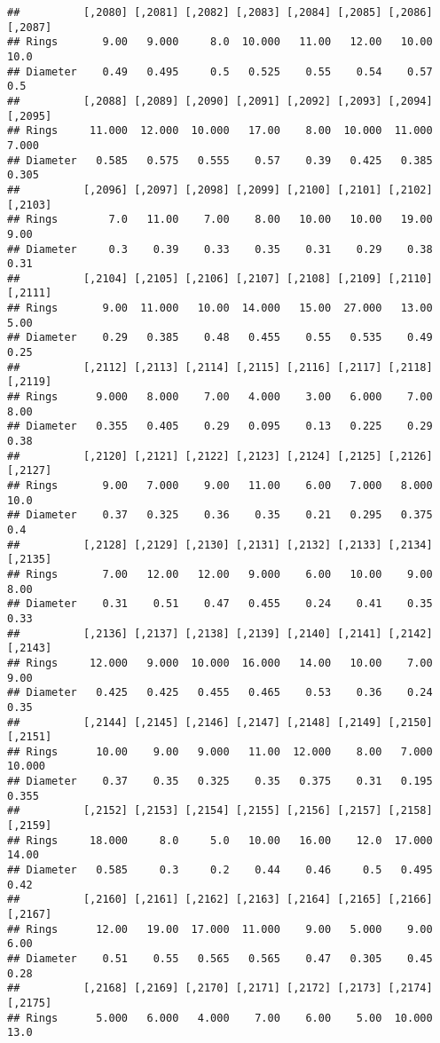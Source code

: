 \documentclass[
]{article}
\begin{document}
\begin{verbatim}
##          [,2080] [,2081] [,2082] [,2083] [,2084] [,2085] [,2086] [,2087]
## Rings       9.00   9.000     8.0  10.000   11.00   12.00   10.00    10.0
## Diameter    0.49   0.495     0.5   0.525    0.55    0.54    0.57     0.5
##          [,2088] [,2089] [,2090] [,2091] [,2092] [,2093] [,2094] [,2095]
## Rings     11.000  12.000  10.000   17.00    8.00  10.000  11.000   7.000
## Diameter   0.585   0.575   0.555    0.57    0.39   0.425   0.385   0.305
##          [,2096] [,2097] [,2098] [,2099] [,2100] [,2101] [,2102] [,2103]
## Rings        7.0   11.00    7.00    8.00   10.00   10.00   19.00    9.00
## Diameter     0.3    0.39    0.33    0.35    0.31    0.29    0.38    0.31
##          [,2104] [,2105] [,2106] [,2107] [,2108] [,2109] [,2110] [,2111]
## Rings       9.00  11.000   10.00  14.000   15.00  27.000   13.00    5.00
## Diameter    0.29   0.385    0.48   0.455    0.55   0.535    0.49    0.25
##          [,2112] [,2113] [,2114] [,2115] [,2116] [,2117] [,2118] [,2119]
## Rings      9.000   8.000    7.00   4.000    3.00   6.000    7.00    8.00
## Diameter   0.355   0.405    0.29   0.095    0.13   0.225    0.29    0.38
##          [,2120] [,2121] [,2122] [,2123] [,2124] [,2125] [,2126] [,2127]
## Rings       9.00   7.000    9.00   11.00    6.00   7.000   8.000    10.0
## Diameter    0.37   0.325    0.36    0.35    0.21   0.295   0.375     0.4
##          [,2128] [,2129] [,2130] [,2131] [,2132] [,2133] [,2134] [,2135]
## Rings       7.00   12.00   12.00   9.000    6.00   10.00    9.00    8.00
## Diameter    0.31    0.51    0.47   0.455    0.24    0.41    0.35    0.33
##          [,2136] [,2137] [,2138] [,2139] [,2140] [,2141] [,2142] [,2143]
## Rings     12.000   9.000  10.000  16.000   14.00   10.00    7.00    9.00
## Diameter   0.425   0.425   0.455   0.465    0.53    0.36    0.24    0.35
##          [,2144] [,2145] [,2146] [,2147] [,2148] [,2149] [,2150] [,2151]
## Rings      10.00    9.00   9.000   11.00  12.000    8.00   7.000  10.000
## Diameter    0.37    0.35   0.325    0.35   0.375    0.31   0.195   0.355
##          [,2152] [,2153] [,2154] [,2155] [,2156] [,2157] [,2158] [,2159]
## Rings     18.000     8.0     5.0   10.00   16.00    12.0  17.000   14.00
## Diameter   0.585     0.3     0.2    0.44    0.46     0.5   0.495    0.42
##          [,2160] [,2161] [,2162] [,2163] [,2164] [,2165] [,2166] [,2167]
## Rings      12.00   19.00  17.000  11.000    9.00   5.000    9.00    6.00
## Diameter    0.51    0.55   0.565   0.565    0.47   0.305    0.45    0.28
##          [,2168] [,2169] [,2170] [,2171] [,2172] [,2173] [,2174] [,2175]
## Rings      5.000   6.000   4.000    7.00    6.00    5.00  10.000    13.0

\end{verbatim}
\end{document}
